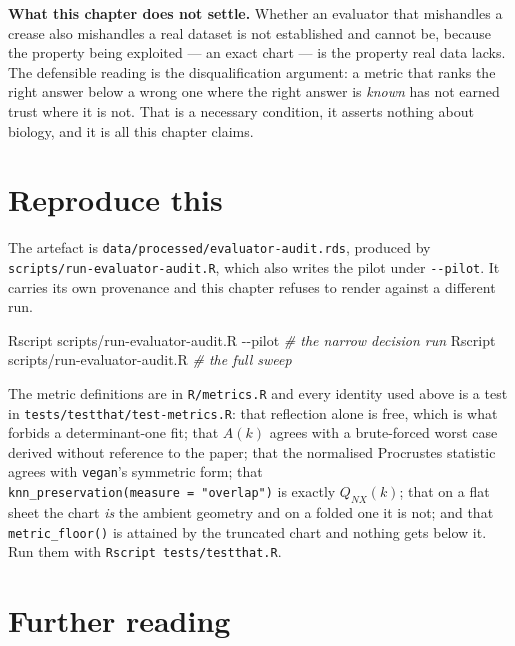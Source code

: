 \documentclass[
  british,
  a4paper,
]{book}
\newenvironment{Shaded}{\begin{snugshade}}{\end{snugshade}}
\newcommand{\AttributeTok}[1]{\textcolor[rgb]{0.13,0.29,0.53}{#1}}
\newcommand{\CommentTok}[1]{\textcolor[rgb]{0.56,0.35,0.01}{\textit{#1}}}
\newcommand{\ExtensionTok}[1]{#1}
\newcommand{\NormalTok}[1]{#1}
\begin{document}
\textbf{What this chapter does not settle.} Whether an evaluator that mishandles a
crease also mishandles a real dataset is not established and cannot be, because
the property being exploited --- an exact chart --- is the property real data lacks.
The defensible reading is the disqualification argument: a metric that ranks the
right answer below a wrong one where the right answer is \emph{known} has not earned
trust where it is not. That is a necessary condition, it asserts nothing about
biology, and it is all this chapter claims.

\section{Reproduce this}\label{eval-reproduce}

The artefact is \texttt{data/processed/evaluator-audit.rds}, produced by
\texttt{scripts/run-evaluator-audit.R}, which also writes the pilot under \texttt{-\/-pilot}.
It carries its own provenance and this chapter refuses to render against a
different run.

\begin{Shaded}
\begin{Highlighting}[]
\ExtensionTok{Rscript}\NormalTok{ scripts/run{-}evaluator{-}audit.R }\AttributeTok{{-}{-}pilot}   \CommentTok{\# the narrow decision run}
\ExtensionTok{Rscript}\NormalTok{ scripts/run{-}evaluator{-}audit.R           }\CommentTok{\# the full sweep}
\end{Highlighting}
\end{Shaded}

The metric definitions are in \texttt{R/metrics.R} and every identity used above is a
test in \texttt{tests/testthat/test-metrics.R}: that reflection alone is free, which is
what forbids a determinant-one fit; that \(A(k)\) agrees with a brute-forced worst
case derived without reference to the paper; that the normalised Procrustes
statistic agrees with \texttt{vegan}'s symmetric form; that
\texttt{knn\_preservation(measure\ =\ "overlap")} is exactly \(Q_{NX}(k)\); that on a flat
sheet the chart \emph{is} the ambient geometry and on a folded one it is not; and
that \texttt{metric\_floor()} is attained by the truncated chart and nothing gets below
it. Run them with \texttt{Rscript\ tests/testthat.R}.

\section{Further reading}\label{eval-reading}
\end{document}
